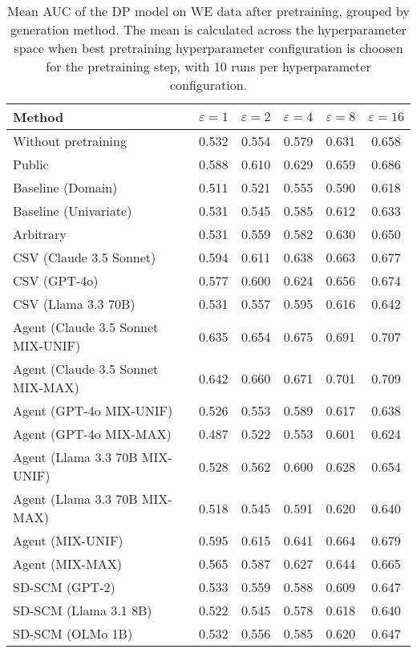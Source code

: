 \begin{table}[h!]
    \centering
    \caption{Mean AUC of the DP model on WE data after pretraining, grouped by generation method. The mean is calculated across the hyperparameter space when best pretraining hyperparameter configuration is choosen for the pretraining step, with 10 runs per hyperparameter configuration.}
    \label{tab:epsilon_comparison}
    \begin{tabular}{lccccc}
    \toprule
    Method & $\varepsilon=1$ & $\varepsilon=2$ & $\varepsilon=4$ & $\varepsilon=8$ & $\varepsilon=16$ \\
    \midrule
    Without pretraining & 0.532 & 0.554 & 0.579 & 0.631 & 0.658 \\
    \arrayrulecolor{black!50!}\midrule
    Public & 0.588 & 0.610 & 0.629 & 0.659 & \cellcolor{bronze!30}0.686 \\
    \arrayrulecolor{black!50!}\midrule
    Baseline (Domain) & 0.511 & 0.521 & 0.555 & 0.590 & 0.618 \\
    Baseline (Univariate) & 0.531 & 0.545 & 0.585 & 0.612 & 0.633 \\
    \arrayrulecolor{black!50!}\midrule
    Arbitrary & 0.531 & 0.559 & 0.582 & 0.630 & 0.650 \\
    \arrayrulecolor{black!50!}\midrule
    CSV (Claude 3.5 Sonnet) & 0.594 & 0.611 & 0.638 & 0.663 & 0.677 \\
    CSV (GPT-4o) & 0.577 & 0.600 & 0.624 & 0.656 & 0.674 \\
    CSV (Llama 3.3 70B) & 0.531 & 0.557 & 0.595 & 0.616 & 0.642 \\
    \arrayrulecolor{black!50!}\midrule
    Agent (Claude 3.5 Sonnet MIX-UNIF) & \cellcolor{silver!30}0.635 & \cellcolor{silver!30}0.654 & \cellcolor{gold!30}0.675 & \cellcolor{silver!30}0.691 & \cellcolor{silver!30}0.707 \\
    Agent (Claude 3.5 Sonnet MIX-MAX) & \cellcolor{gold!30}0.642 & \cellcolor{gold!30}0.660 & \cellcolor{silver!30}0.671 & \cellcolor{gold!30}0.701 & \cellcolor{gold!30}0.709 \\
    Agent (GPT-4o MIX-UNIF) & 0.526 & 0.553 & 0.589 & 0.617 & 0.638 \\
    Agent (GPT-4o MIX-MAX) & 0.487 & 0.522 & 0.553 & 0.601 & 0.624 \\
    Agent (Llama 3.3 70B MIX-UNIF) & 0.528 & 0.562 & 0.600 & 0.628 & 0.654 \\
    Agent (Llama 3.3 70B MIX-MAX) & 0.518 & 0.545 & 0.591 & 0.620 & 0.640 \\
    Agent (MIX-UNIF) & \cellcolor{bronze!30}0.595 & \cellcolor{bronze!30}0.615 & \cellcolor{bronze!30}0.641 & \cellcolor{bronze!30}0.664 & 0.679 \\
    Agent (MIX-MAX) & 0.565 & 0.587 & 0.627 & 0.644 & 0.665 \\
    \arrayrulecolor{black!50!}\midrule
    SD-SCM (GPT-2) & 0.533 & 0.559 & 0.588 & 0.609 & 0.647 \\
    SD-SCM (Llama 3.1 8B) & 0.522 & 0.545 & 0.578 & 0.618 & 0.640 \\
    SD-SCM (OLMo 1B) & 0.532 & 0.556 & 0.585 & 0.620 & 0.647 \\
    \bottomrule
    \end{tabular}
\end{table}